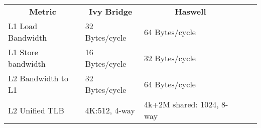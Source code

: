 \begin{table}[h]
\begin{tabular}{|l|l|l|ll}
\cline{1-3}
\multicolumn{1}{|c|}{\textbf{Metric}} & \multicolumn{1}{c|}{\textbf{Ivy Bridge}} & \multicolumn{1}{c|}{\textbf{Haswell}} &  &  \\ \cline{1-3}
L1 Load Bandwidth                     & 32 Bytes/cycle                           & 64 Bytes/cycle                        &  &  \\ \cline{1-3}
L1 Store bandwidth                    & 16 Bytes/cycle                           & 32 Bytes/cycle                        &  &  \\ \cline{1-3}
L2 Bandwidth to L1                    & 32 Bytes/cycle                           & 64 Bytes/cycle                        &  &  \\ \cline{1-3}
L2 Unified TLB                        & 4K:512, 4-way                            & 4k+2M shared: 1024, 8-way             &  &  \\ \cline{1-3}
\end{tabular}
\end{table}

